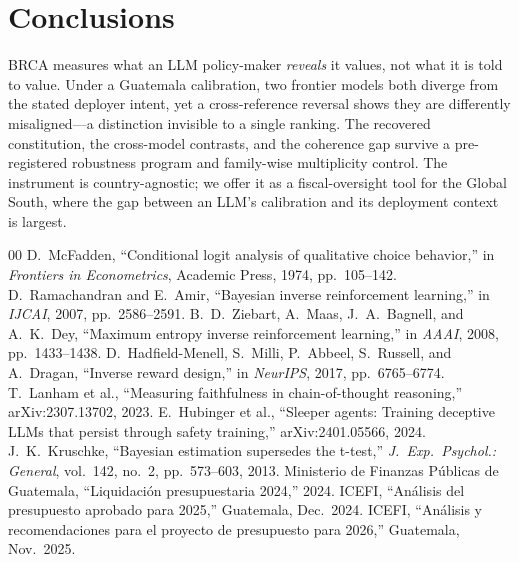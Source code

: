 \documentclass[conference]{IEEEtran}
\begin{document}
\section{Conclusions}
BRCA measures what an LLM policy-maker \emph{reveals} it values, not what
it is told to value. Under a Guatemala calibration, two frontier models
both diverge from the stated deployer intent, yet a cross-reference
reversal shows they are differently misaligned---a distinction invisible
to a single ranking. The recovered constitution, the cross-model
contrasts, and the coherence gap survive a pre-registered robustness
program and family-wise multiplicity control. The instrument is
country-agnostic; we offer it as a fiscal-oversight tool for the Global
South, where the gap between an LLM's calibration and its deployment
context is largest.

\begin{thebibliography}{00}
 D.~McFadden, ``Conditional logit analysis of
qualitative choice behavior,'' in \emph{Frontiers in Econometrics},
Academic Press, 1974, pp.~105--142.
 D.~Ramachandran and E.~Amir, ``Bayesian
inverse reinforcement learning,'' in \emph{IJCAI}, 2007, pp.~2586--2591.
 B.~D.~Ziebart, A.~Maas, J.~A.~Bagnell, and
A.~K.~Dey, ``Maximum entropy inverse reinforcement learning,'' in
\emph{AAAI}, 2008, pp.~1433--1438.
 D.~Hadfield-Menell, S.~Milli, P.~Abbeel,
S.~Russell, and A.~Dragan, ``Inverse reward design,'' in \emph{NeurIPS},
2017, pp.~6765--6774.
 T.~Lanham et al., ``Measuring faithfulness in
chain-of-thought reasoning,'' arXiv:2307.13702, 2023.
 E.~Hubinger et al., ``Sleeper agents: Training
deceptive LLMs that persist through safety training,'' arXiv:2401.05566,
2024.
 J.~K.~Kruschke, ``Bayesian estimation supersedes
the t-test,'' \emph{J.\ Exp.\ Psychol.: General}, vol.~142, no.~2,
pp.~573--603, 2013.
 Ministerio de Finanzas P\'ublicas de Guatemala,
``Liquidaci\'on presupuestaria 2024,'' 2024.
 ICEFI, ``An\'alisis del presupuesto aprobado para
2025,'' Guatemala, Dec.~2024.
 ICEFI, ``An\'alisis y recomendaciones para el
proyecto de presupuesto para 2026,'' Guatemala, Nov.~2025.
\end{thebibliography}
\end{document}
